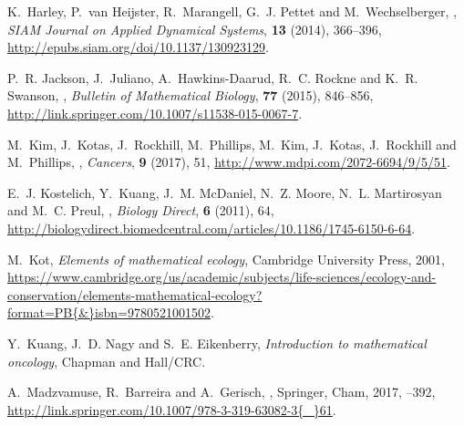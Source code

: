 \documentclass{aims}
\numberwithin{equation}{section}
\begin{document}
\begin{thebibliography}{10}
\newblock K.~Harley, P.~van Heijster, R.~Marangell, G.~J. Pettet and
  M.~Wechselberger,
,
\newblock \emph{SIAM Journal on Applied Dynamical Systems}, \textbf{13} (2014),
  366--396,
\newblock \urlprefix\url{http://epubs.siam.org/doi/10.1137/130923129}.

\newblock P.~R. Jackson, J.~Juliano, A.~Hawkins-Daarud, R.~C. Rockne and K.~R.
  Swanson,
,
\newblock \emph{Bulletin of Mathematical Biology}, \textbf{77} (2015),
  846--856,
\newblock \urlprefix\url{http://link.springer.com/10.1007/s11538-015-0067-7}.

\newblock M.~Kim, J.~Kotas, J.~Rockhill, M.~Phillips, M.~Kim, J.~Kotas,
  J.~Rockhill and M.~Phillips,
,
\newblock \emph{Cancers}, \textbf{9} (2017), 51,
\newblock \urlprefix\url{http://www.mdpi.com/2072-6694/9/5/51}.

\newblock E.~J. Kostelich, Y.~Kuang, J.~M. McDaniel, N.~Z. Moore, N.~L.
  Martirosyan and M.~C. Preul,
,
\newblock \emph{Biology Direct}, \textbf{6} (2011), 64,
\newblock
  \urlprefix\url{http://biologydirect.biomedcentral.com/articles/10.1186/1745-6150-6-64}.

\newblock M.~Kot,
\newblock \emph{{Elements of mathematical ecology}},
\newblock Cambridge University Press, 2001,
\newblock
  \urlprefix\url{https://www.cambridge.org/us/academic/subjects/life-sciences/ecology-and-conservation/elements-mathematical-ecology?format=PB{\&}isbn=9780521001502}.

\newblock Y.~Kuang, J.~D. Nagy and S.~E. Eikenberry,
\newblock \emph{{Introduction to mathematical oncology}},
\newblock Chapman and Hall/CRC.

\newblock A.~Madzvamuse, R.~Barreira and A.~Gerisch,
,
\newblock Springer, Cham, 2017,
--392,
\newblock
  \urlprefix\url{http://link.springer.com/10.1007/978-3-319-63082-3{\_}61}.


\end{thebibliography}
\end{document}
